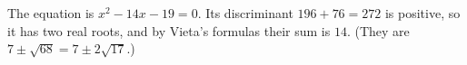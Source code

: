The equation is $x^2-14x-19=0$. Its discriminant $196+76=272$ is positive, so it has two real roots, and by Vieta's formulas their sum is $\boxed{14}$. (They are $7\pm\sqrt{68}=7\pm2\sqrt{17}$.)
